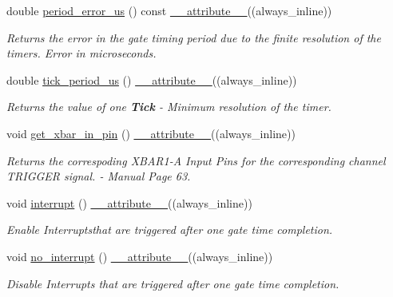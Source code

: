 \begin{DoxyCompactItemize}
double \hyperlink{group__Controls_ga3fedb5ff5a44b664e8132f4e2836b155}{period\+\_\+error\+\_\+us} () const \hyperlink{utilities_8hpp_a103d5b3998e0dd804213c8f30a094f4d}{\+\_\+\+\_\+attribute\+\_\+\+\_\+}((always\+\_\+inline))
\begin{DoxyCompactList}\small\item\em Returns the error in the gate timing period due to the finite resolution of the timers.  Error in microseconds. \end{DoxyCompactList}\item 
double \hyperlink{group__Controls_ga2b64ce8a01dc1254002c4ff3c384a6fd}{tick\+\_\+period\+\_\+us} () \hyperlink{utilities_8hpp_a103d5b3998e0dd804213c8f30a094f4d}{\+\_\+\+\_\+attribute\+\_\+\+\_\+}((always\+\_\+inline))
\begin{DoxyCompactList}\small\item\em Returns the value of one {\bfseries Tick} -\/ Minimum resolution of the timer. \end{DoxyCompactList}\item 
void \hyperlink{group__Controls_ga19f11a8cdb94353ffaaa5a2eccf35ee5}{get\+\_\+xbar\+\_\+in\+\_\+pin} () \hyperlink{utilities_8hpp_a103d5b3998e0dd804213c8f30a094f4d}{\+\_\+\+\_\+attribute\+\_\+\+\_\+}((always\+\_\+inline))
\begin{DoxyCompactList}\small\item\em Returns the correspoding X\+B\+A\+R1-\/A Input Pins for the corresponding channel T\+R\+I\+G\+G\+ER signal.  -\/ Manual Page 63. \end{DoxyCompactList}\item 
void \hyperlink{group__Interrupt_gaf1a21e0b3f9a57e247aa40c457e15ee3}{interrupt} () \hyperlink{utilities_8hpp_a103d5b3998e0dd804213c8f30a094f4d}{\+\_\+\+\_\+attribute\+\_\+\+\_\+}((always\+\_\+inline))
\begin{DoxyCompactList}\small\item\em Enable Interruptsthat are triggered after one gate time completion. \end{DoxyCompactList}\item 
void \hyperlink{group__Interrupt_ga6e36c84f319e52e5a14ca20f299b64b5}{no\+\_\+interrupt} () \hyperlink{utilities_8hpp_a103d5b3998e0dd804213c8f30a094f4d}{\+\_\+\+\_\+attribute\+\_\+\+\_\+}((always\+\_\+inline))
\begin{DoxyCompactList}\small\item\em Disable Interrupts that are triggered after one gate time completion. \end{DoxyCompactList}\item 

\end{DoxyCompactItemize}
